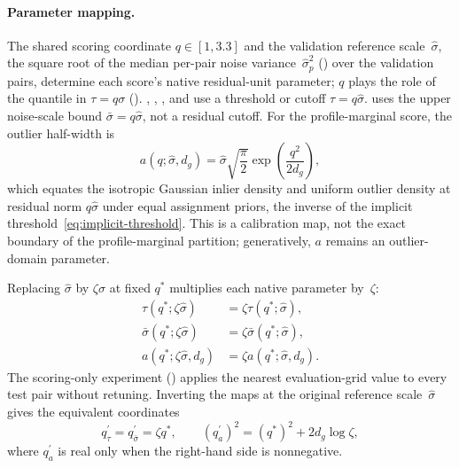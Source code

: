 \paragraph{Parameter mapping.}
\label{sec:supp-scale-mapping}

The shared scoring coordinate $q\in[1,3.3]$ and the validation reference
scale~$\hat\sigma$, the square root of the median per-pair noise
variance~$\hat\sigma_p^2$ () over the
validation pairs, determine each score's native residual-unit parameter;
$q$ plays the role of the quantile in $\tau = q\sigma$ ().
\ransac, \msac, \simfitpp, and \gau use a threshold or cutoff
$\tau=q\hat\sigma$. \magsacpp uses the upper noise-scale bound
$\bar\sigma=q\hat\sigma$, not a residual cutoff. For the profile-marginal
score, the outlier half-width is
\begin{equation}
	a(q;\hat\sigma,d_g)=\hat\sigma\sqrt{\frac{\pi}{2}}
	\exp\!\left(\frac{q^2}{2d_g}\right),
	\label{eq:native-scale-maps}
\end{equation}
which equates the isotropic Gaussian inlier density and uniform outlier
density at residual norm $q\hat\sigma$ under equal assignment priors, the
inverse of the implicit threshold~\eqref{eq:implicit-threshold}. This is a
calibration map, not the exact boundary of the profile-marginal partition;
generatively, $a$ remains an outlier-domain parameter.

Replacing $\hat\sigma$ by $\zeta\hat\sigma$ at fixed $q^*$ multiplies each
native parameter by~$\zeta$:
\begin{equation}
	\begin{aligned}
		\tau(q^*;\zeta\hat\sigma)          & =\zeta\tau(q^*;\hat\sigma),             \\
		\bar\sigma(q^*;\zeta\hat\sigma)    & =\zeta\bar\sigma(q^*;\hat\sigma),       \\
		a(q^*;\zeta\hat\sigma,d_g)         & =\zeta a(q^*;\hat\sigma,d_g).
	\end{aligned}
	\label{eq:native-scale-corruption}
\end{equation}
The scoring-only experiment () applies the nearest
evaluation-grid value to every test pair without retuning. Inverting the
maps at the original reference scale~$\hat\sigma$ gives the equivalent
coordinates
\begin{equation}
	q_{\tau}^{\prime}=q_{\bar\sigma}^{\prime}=\zeta q^*,
	\qquad
	(q_a^{\prime})^2=(q^*)^2+2d_g\log\zeta,
	\label{eq:corrupted-cutoff}
\end{equation}
where $q_a^{\prime}$ is real only when the right-hand side is nonnegative.

